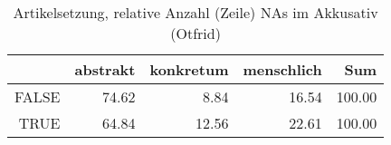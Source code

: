 \begin{table}[ht]
\centering
\begin{tabular}{rrrrr}
  \hline
 & abstrakt & konkretum & menschlich & Sum \\ 
  \hline
FALSE & 74.62 & 8.84 & 16.54 & 100.00 \\ 
  TRUE & 64.84 & 12.56 & 22.61 & 100.00 \\ 
   \hline
\end{tabular}
\caption{Artikelsetzung, relative Anzahl (Zeile) NAs im Akkusativ (Otfrid)} 
\end{table}
